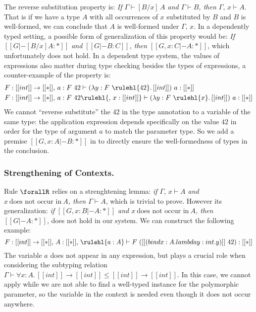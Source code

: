 The reverse substitution property is:
\emph{If $\Gamma \vdash [B / x] \, A$ and $\Gamma \vdash B$, then $\Gamma,\, x \vdash A$}.
That is if we have a type $A$ with all occurrences of $x$ substituted by $B$ and $B$
is well-formed, we can conclude that $A$ is well-formed under $\Gamma,\, x$.
In a dependently typed setting, a possible form of generalization of this property
would be:
\emph{If $[[G |- [B / x] A : *]]$ and $[[G |- B : C]]$, then $[[G , x : C |- A : *]]$},
which unfortunately does not hold.
In a dependent type system, the values of expressions also matter during type checking
besides the types of expressions, a counter-example of the property is:
\begin{align*}
& F : [[int]] \rightarrow [[*]],\, a : F~42  \vdash (\lambda y : F~\rulehl{42}.\, [[int]]) ~ a : [[*]] \\
& F : [[int]] \rightarrow [[*]],\, a : F~42  \rulehl{,\, x : [[int]]} \vdash (\lambda y : F~\rulehl{x}.\, [[int]]) ~ a : [[*]]
\end{align*}
We cannot ``reverse substitute'' the $42$ in the type annotation to a variable
of the same type: the application expression depends specifically on the value
$42$ in order for the type of argument $a$ to match the parameter type.
So we add a premise $[[G , x : A |- B : *]]$ in  to directly
ensure the well-formedness of types in the conclusion.

\subsubsection{Strengthening of Contexts.}

Rule $\forallR$ relies on a strenghtening lemma:
\emph{if $\Gamma,\, x \vdash A$ and $x ~\text{does not occur in}~ A$, then $\Gamma \vdash A$}, which
is trivial to prove.
However its generalization:
\emph{if $[[G, x : B |- A : *]]$ and $x ~\text{does not occur in}~ A$, then $[[G |- A : *]]$},
does not hold in our system. We can construct the following example:
\begin{equation*}
    F : [[int]] \rightarrow [[*]],\, A : [[*]],\, \rulehl{a : A} \vdash F ~ ([[(bind x : A. lambda y : int. y)]]~ 42) : [[*]]
\end{equation*}
The variable $a$ does not appear in any expression, but plays a
crucial role when considering the subtyping relation $\Gamma \vdash \forall x : A.\, [[int]] \rightarrow [[int]] \le [[int]] \rightarrow [[int]]$.
In this case, we cannot apply  while we are not able to find a
well-typed instance for the polymorphic parameter, so the variable in the context
is needed even though it does not occur anywhere.

